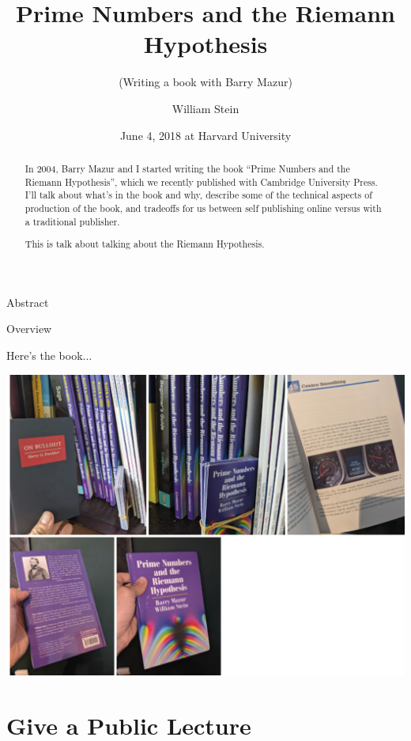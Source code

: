 \documentclass{beamer}
\title[Prime Numbers]{Prime Numbers and the Riemann Hypothesis}
\subtitle{(Writing a book with Barry Mazur)}
\author[W.\thinspace{}Stein]{William Stein}
\date[Mazur 80]{June 4, 2018 at Harvard University}
\institute[SageMath, Inc. \& UW]{SageMath, Inc. and University of Washington}
\begin{document}
\begin{frame}
  \titlepage
\end{frame}

\begin{frame}{Abstract}
  \begin{abstract}
    In 2004, Barry Mazur and I started writing the
    book ``Prime Numbers and the Riemann Hypothesis'', which we recently
    published with Cambridge University Press. I'll talk about
    what's in the book and why, describe some of the technical aspects
    of production of the book, and tradeoffs for us between
    self publishing online versus with a traditional publisher.

    \vspace{.3in}
    This is talk about talking about the Riemann Hypothesis.
  \end{abstract}
\end{frame}

\begin{frame}{Overview}
  \tableofcontents
\end{frame}

\begin{frame}{Here's the book...}
  \begin{center}
    \includegraphics[height=.82\textheight]{pics/the-book.png}
  \end{center}
\end{frame}

\section{Give a Public Lecture}
\end{document}
